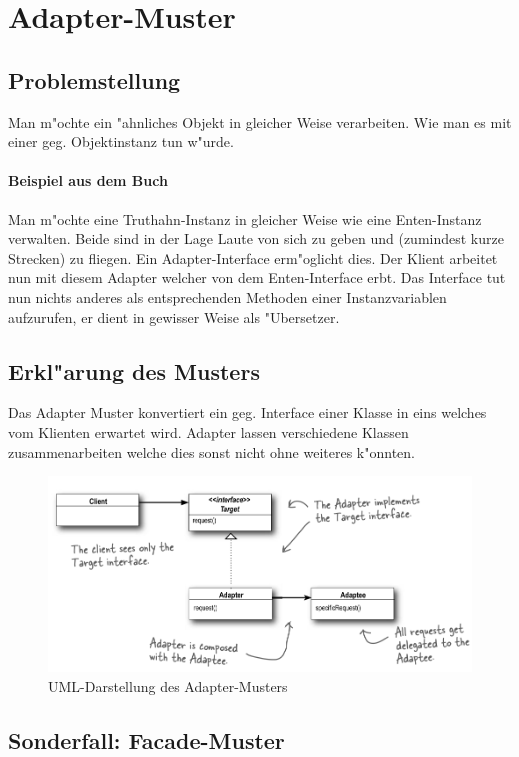 \section{Adapter-Muster}

\subsection{Problemstellung}
Man m"ochte ein "ahnliches Objekt in gleicher Weise verarbeiten. Wie man es mit einer geg. Objektinstanz tun w"urde. 

\paragraph{Beispiel aus dem Buch}
Man m"ochte eine Truthahn-Instanz in gleicher Weise wie eine Enten-Instanz verwalten. Beide sind in der Lage Laute von sich zu geben und (zumindest kurze Strecken) zu fliegen. Ein Adapter-Interface erm"oglicht dies. Der Klient arbeitet nun mit diesem Adapter welcher von dem Enten-Interface erbt. Das Interface tut nun nichts anderes als entsprechenden Methoden einer Instanzvariablen aufzurufen, er dient in gewisser Weise als "Ubersetzer. 

\subsection{Erkl"arung des Musters}
Das Adapter Muster konvertiert ein geg. Interface einer Klasse in eins welches vom Klienten erwartet wird. Adapter lassen verschiedene Klassen zusammenarbeiten welche dies sonst nicht ohne weiteres k"onnten. 

\begin{figure}[b!]
	\centering
	\includegraphics[width=1\linewidth]{adapter/img/adapterUML}
	\caption{UML-Darstellung des Adapter-Musters}
	\label{fig:adapterUML}
\end{figure}

\subsection{Sonderfall: Facade-Muster}
